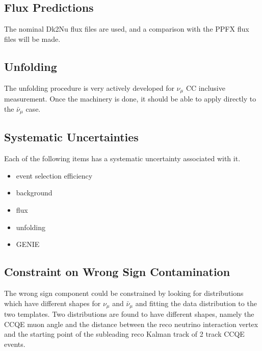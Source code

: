 \documentclass[12pt,a4paper,final]{iopart}
\begin{document}
\subsection{Flux Predictions}
The nominal Dk2Nu flux files are used, and a comparison with the PPFX flux files will be made.

\subsection{Unfolding}
The unfolding procedure is very actively developed for $\nu_\mu$ CC inclusive measurement. Once the machinery is done, it should be able to apply directly to the $\bar{\nu}_\mu$ case.

\subsection{Systematic Uncertainties}
Each of the following items has a systematic uncertainty associated with it.
\begin{itemize}
  \item event selection efficiency
  \item background
  \item flux
  \item unfolding
  \item GENIE
\end{itemize}

\subsection{Constraint on Wrong Sign Contamination}
The wrong sign component could be constrained by looking for distributions which have different shapes for $\nu_\mu$ and $\bar{\nu}_\mu$ and fitting the data distribution to the two templates. Two distributions are found to have different shapes, namely the CCQE muon angle and the distance between the reco neutrino interaction vertex and the starting point of the subleading reco Kalman track of 2 track CCQE events.
\end{document}
